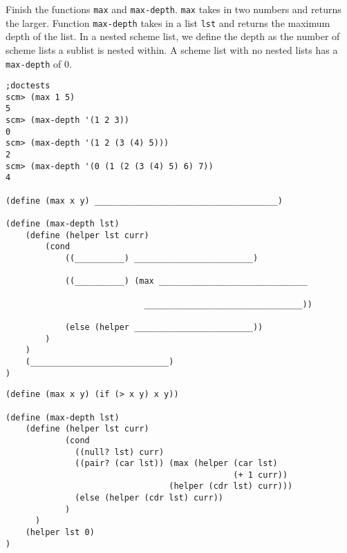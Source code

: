 \begin{blocksection}
\question Finish the functions \lstinline{max} and \lstinline{max-depth}. \lstinline{max} takes in two numbers and returns the larger. Function \lstinline{max-depth} takes in a list \lstinline{lst} and returns the maximum depth of the list. In a nested scheme list, we define the depth as the number of scheme lists a sublist is nested within. A scheme list with no nested lists has a \lstinline{max-depth} of 0. 

\begin{lstlisting}
;doctests
scm> (max 1 5)
5
scm> (max-depth '(1 2 3))
0
scm> (max-depth '(1 2 (3 (4) 5)))
2
scm> (max-depth '(0 (1 (2 (3 (4) 5) 6) 7))
4

(define (max x y) _____________________________________)

(define (max-depth lst)
    (define (helper lst curr)
        (cond 
            ((__________) ________________________)

            ((__________) (max ______________________________

                            ________________________________))
                            
            (else (helper ________________________))
        )
    )
    (____________________________)
)
\end{lstlisting}
\end{blocksection}

\begin{blocksection}
\begin{solution}
\begin{lstlisting}
(define (max x y) (if (> x y) x y))

(define (max-depth lst)
    (define (helper lst curr)
            (cond 
              ((null? lst) curr)
              ((pair? (car lst)) (max (helper (car lst) 
                                              (+ 1 curr)) 
                                 (helper (cdr lst) curr)))
              (else (helper (cdr lst) curr))
            )
      )
    (helper lst 0)
)

\end{lstlisting}
\end{solution}
\end{blocksection}

